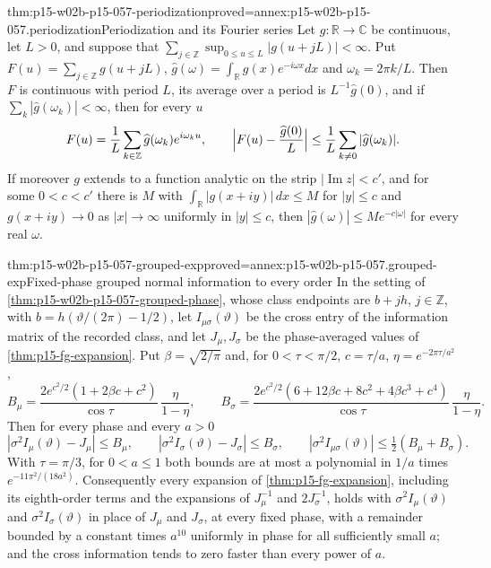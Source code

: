 \begin{hblemma}{thm:p15-w02b-p15-057-periodization}{proved=annex:p15-w02b-p15-057.periodization}{Periodization and its Fourier series}
Let \(g:\mathbb R\to\mathbb C\) be continuous, let \(L>0\), and suppose
that \(\sum_{j\in\mathbb Z}\sup_{0\leq u\leq L}|g(u+jL)|<\infty\). Put
\(F(u)=\sum_{j\in\mathbb Z}g(u+jL)\),
\(\widehat g(\omega)=\int_{\mathbb R}g(x)e^{-i\omega x}dx\) and
\(\omega_k=2\pi k/L\). Then \(F\) is continuous with period \(L\), its
average over a period is \(L^{-1}\widehat g(0)\), and if
\(\sum_k|\widehat g(\omega_k)|<\infty\), then for every \(u\)
\[
 F(u)=\frac1L\sum_{k\in\mathbb Z}\widehat g(\omega_k)e^{i\omega_ku},
 \qquad
 \Bigl|F(u)-\frac{\widehat g(0)}L\Bigr|\leq\frac1L\sum_{k\neq0}
 |\widehat g(\omega_k)|.
\]
If moreover \(g\) extends to a function analytic on the strip
\(|\operatorname{Im}z|<c'\), and for some \(0<c<c'\) there is \(M\) with
\(\int_{\mathbb R}|g(x+iy)|\,dx\leq M\) for \(|y|\leq c\) and
\(g(x+iy)\to0\) as \(|x|\to\infty\) uniformly in \(|y|\leq c\), then
\(|\widehat g(\omega)|\leq Me^{-c|\omega|}\) for every real \(\omega\).
\end{hblemma}

\begin{hbtheorem}{thm:p15-w02b-p15-057-grouped-exp}{proved=annex:p15-w02b-p15-057.grouped-exp}{Fixed-phase grouped normal information to every order}
In the setting of \cref{thm:p15-w02b-p15-057-grouped-phase}, whose class
endpoints are \(b+jh\), \(j\in\mathbb Z\), with
\(b=h(\vartheta/(2\pi)-1/2)\), let \(I_{\mu\sigma}(\vartheta)\)
be the cross entry of the information matrix of the recorded class, and let
\(J_\mu,J_\sigma\) be the phase-averaged values of
\cref{thm:p15-fg-expansion}. Put \(\beta=\sqrt{2/\pi}\) and, for
\(0<\tau<\pi/2\), \(c=\tau/a\), \(\eta=e^{-2\pi\tau/a^2}\),
\[
 B_\mu=\frac{2e^{c^2/2}(1+2\beta c+c^2)}{\cos\tau}\,\frac\eta{1-\eta},\qquad
 B_\sigma=\frac{2e^{c^2/2}(6+12\beta c+8c^2+4\beta c^3+c^4)}{\cos\tau}\,\frac\eta{1-\eta}.
\]
Then for every phase and every \(a>0\)
\[
 |\sigma^2I_\mu(\vartheta)-J_\mu|\leq B_\mu,\qquad
 |\sigma^2I_\sigma(\vartheta)-J_\sigma|\leq B_\sigma,\qquad
 |\sigma^2I_{\mu\sigma}(\vartheta)|\leq\tfrac12(B_\mu+B_\sigma).
\]
With \(\tau=\pi/3\), for \(0<a\leq1\) both bounds are at most a polynomial
in \(1/a\) times \(e^{-11\pi^2/(18a^2)}\). Consequently every expansion of
\cref{thm:p15-fg-expansion}, including its eighth-order terms and the
expansions of \(J_\mu^{-1}\) and \(2J_\sigma^{-1}\), holds with
\(\sigma^2I_\mu(\vartheta)\) and \(\sigma^2I_\sigma(\vartheta)\) in place of
\(J_\mu\) and \(J_\sigma\), at every fixed phase, with a remainder bounded by
a constant times \(a^{10}\) uniformly in phase for all sufficiently small
\(a\); and the cross information tends to zero faster than every power of
\(a\).
\end{hbtheorem}

